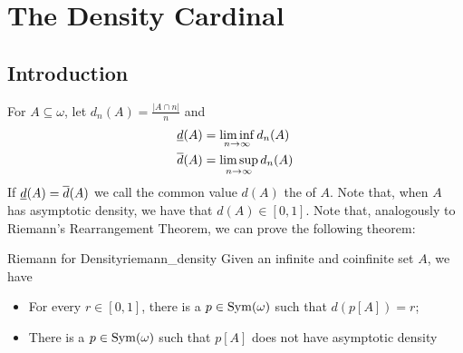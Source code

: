 \chapter{The Density Cardinal}

\section{Introduction}

For $A\subseteq\omega$, let $d_n(A)=\frac{\lvert A\cap n\rvert}{n}$ and
\begin{align*}
    \underline{d}(A) & = \liminf_{n\to\infty} d_n(A)\\
    \overline{d}(A) & = \limsup_{n\to\infty} d_n(A)
\end{align*}
If $\underline{d}(A)=\overline{d}(A)$ we call the common value $d(A)$ the  of $A$. Note that, when $A$ has asymptotic density, we have that $d(A)\in[0,1]$. Note that, analogously to Riemann's Rearrangement Theorem, we can prove the following theorem:

\begin{lemma}{Riemann for Density}{riemann_density}
    Given an infinite and coinfinite set $A$, we have
    \begin{itemize}
        \item For every $r\in[0,1]$, there is a $p\in\mathrm{Sym}(\omega)$ such that $d(p[A])=r$;
        \item There is a $p\in\mathrm{Sym}(\omega)$ such that $p[A]$ does not have asymptotic density
    \end{itemize}
\end{lemma}

